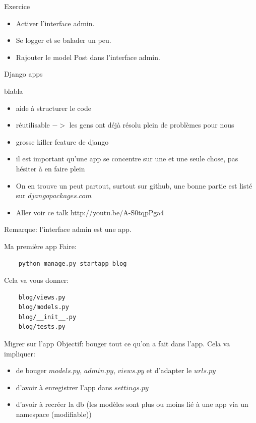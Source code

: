 \documentclass{beamer}
\begin{document}
\begin{frame}[fragile]{Exercice}
    \begin{itemize}
        \item Activer l'interface admin.
        \item Se logger et se balader un peu.
        \item Rajouter le model Post dans l'interface admin.
    \end{itemize}
\end{frame}

\begin{frame}[fragile]{}
\begin{LARGE}
\begin{center}
Django apps
\end{center}
\end{LARGE}
\end{frame}

\begin{frame}[fragile]{blabla}
    \begin{itemize}
        \item aide à structurer le code\pause
        \item réutilisable $->$ les gens ont déjà résolu plein de problèmes pour nous\pause
        \item grosse killer feature de django\pause
        \item il est important qu'une app se concentre sur une et une seule chose, pas hésiter à en faire plein\pause
        \item On en trouve un peut partout, surtout sur github, une bonne partie est listé sur $djangopackages.com$\pause
        \item Aller voir ce talk http://youtu.be/A-S0tqpPga4\pause
    \end{itemize}
    Remarque: l'interface admin est une app.
\end{frame}

\begin{frame}[fragile]{Ma première app}
    Faire:
\begin{verbatim}
    python manage.py startapp blog
\end{verbatim}
\pause

    Cela va vous donner:
\begin{verbatim}
    blog/views.py
    blog/models.py
    blog/__init__.py
    blog/tests.py
\end{verbatim}
\end{frame}

\begin{frame}[fragile]{Migrer sur l'app}
    Objectif: bouger tout ce qu'on a fait dans l'app. Cela va impliquer:
    \begin{itemize}
        \item de bouger $models.py$, $admin.py$, $views.py$ et d'adapter le $urls.py$
        \item d'avoir à enregistrer l'app dans $settings.py$
        \item d'avoir à recréer la db (les modèles sont plus ou moins lié à une app via un namespace (modifiable))
    \end{itemize}
\end{frame}
\end{document}
